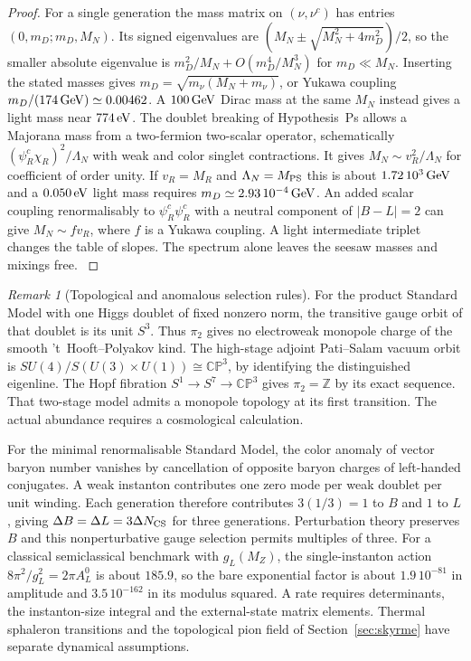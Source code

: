 \documentclass[aps,pra,onecolumn,superscriptaddress,nofootinbib,10pt]{revtex4-2}
\theoremstyle{definition}
\theoremstyle{remark}
\newtheorem{remark}[theorem]{Remark}
\begin{document}
\begin{proof}
For a single generation the mass matrix on $(\nu,\nu^c)$ has entries
$(0,m_D;m_D,M_N)$. Its signed eigenvalues are
$(M_N\pm\sqrt{M_N^2+4m_D^2})/2$, so the smaller absolute eigenvalue is
$m_D^2/M_N+O(m_D^4/M_N^3)$ for $m_D\ll M_N$.
Inserting the stated masses gives $m_D=\sqrt{m_\nu(M_N+m_\nu)}$, or Yukawa
coupling $m_D/(174\,{\rm GeV})\simeq0.00462$. A $100\,{\rm GeV}$ Dirac
mass at the same $M_N$ instead gives a light mass near $774\,{\rm eV}$.
The doublet breaking of Hypothesis~Ps allows a Majorana
mass from a two-fermion two-scalar operator, schematically
$(\psi_R^c\chi_R)^2/\Lambda_N$ with weak and color singlet contractions.
It gives $M_N\sim v_R^2/\Lambda_N$ for coefficient of order unity.
If $v_R=M_R$ and $\Lambda_N=M_{\rm PS}$ this is about
$1.72\,10^3\,{\rm GeV}$ and a $0.050\,{\rm eV}$ light mass requires
$m_D\simeq2.93\,10^{-4}\,{\rm GeV}$. An added scalar coupling
renormalisably to $\psi_R^c\psi_R^c$ with a neutral component of
$|B-L|=2$ can give $M_N\sim f v_R$, where $f$ is a Yukawa coupling.
A light intermediate triplet changes the table of slopes. The spectrum
alone leaves the seesaw masses and mixings free. \cite{ub:seesaw}
\end{proof}

\begin{remark}[Topological and anomalous selection rules]\label{ub:topology}
For the product Standard Model with one Higgs doublet of fixed nonzero
norm, the transitive gauge orbit of that doublet is its unit $S^3$.
Thus $\pi_2$ gives no electroweak monopole charge of the smooth
't~Hooft--Polyakov kind. The high-stage adjoint Pati--Salam vacuum
orbit is $SU(4)/S(U(3)\times U(1))\cong\mathbb{CP}^3$, by
identifying the distinguished eigenline. The Hopf fibration
$S^1\to S^7\to\mathbb{CP}^3$ gives $\pi_2=\mathbb Z$ by its exact
sequence. That two-stage model admits a monopole topology at its first
transition. The actual abundance requires a cosmological calculation.

For the minimal renormalisable Standard Model, the color anomaly of
vector baryon number vanishes by cancellation of opposite baryon charges
of left-handed conjugates. A weak instanton contributes one zero mode
per weak doublet per unit winding. Each generation therefore contributes
$3(1/3)=1$ to $B$ and $1$ to $L$, giving
$\Delta B=\Delta L=3\Delta N_{\rm CS}$ for three generations.
Perturbation theory preserves $B$ and this nonperturbative gauge
selection permits multiples of three. For a classical semiclassical
benchmark with $g_L(M_Z)$, the single-instanton action
$8\pi^2/g_L^2=2\pi A_L^0$ is about $185.9$, so the bare exponential
factor is about $1.9\,10^{-81}$ in amplitude and
$3.5\,10^{-162}$ in its modulus squared. A rate requires determinants,
the instanton-size integral and the external-state matrix elements.
Thermal sphaleron transitions and the topological pion field of
Section~\ref{sec:skyrme} have separate dynamical assumptions.
\cite{ub:thooft,ub:sphaleron}
\end{remark}
\end{document}
